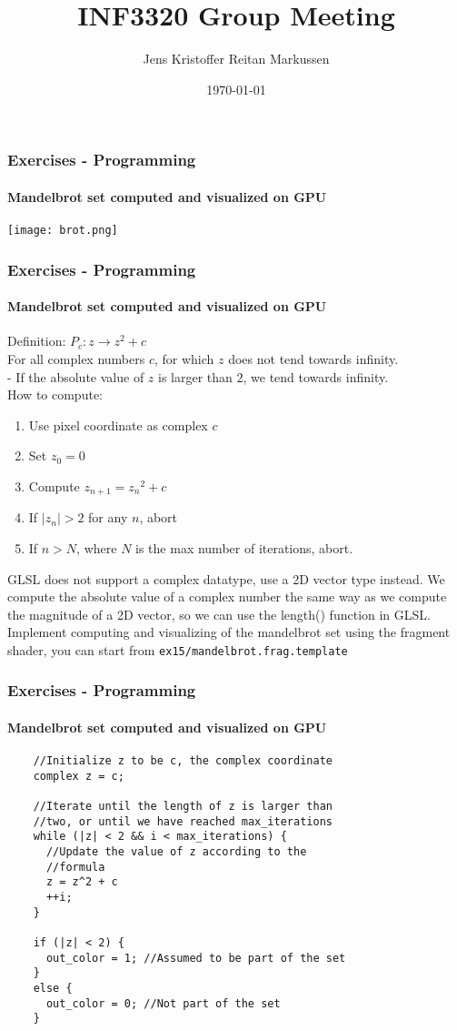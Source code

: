 \documentclass[8pt]{beamer}
\title{INF3320 Group Meeting}
\author{Jens Kristoffer Reitan Markussen}
\date{\today}
\begin{document}

	\begin{frame}
	\frametitle{Exercises - Programming}
	\framesubtitle{Mandelbrot set computed and visualized on GPU}
	\texttt{[image: brot.png]}
	
	\end{frame}
	
	\begin{frame}[fragile]
	\frametitle{Exercises - Programming}
	\framesubtitle{Mandelbrot set computed and visualized on GPU}
	Definition: $P_c:z\rightarrow z^2 + c$\\ 
	For all complex numbers $c$, for which $z$ does not tend towards infinity. \\
	- If the absolute value of $z$ is larger than $2$, we tend towards infinity.  
	\\ \bigskip
	How to compute:
	\begin{enumerate}
	\item Use pixel coordinate as complex $c$
	\item Set $z_0 = 0$
	\item Compute $z_{n+1} = {z_n}^2 + c$
	\item If $|z_n| > 2$ for any $n$, abort
	\item If $n > N$, where $N$ is the max number of iterations, abort.
	\end{enumerate}
	
	\bigskip
	GLSL does not support a complex datatype, use a 2D vector type instead. We compute the absolute value of a complex number the same way as we compute the magnitude of a 2D vector, so we can use the length() function in GLSL. \\ \bigskip
	Implement computing and visualizing of the mandelbrot set using the fragment shader, you can start from \verb|ex15/mandelbrot.frag.template|
	
	\end{frame}	
	
	\begin{frame}[fragile]
	\frametitle{Exercises - Programming}
	\framesubtitle{Mandelbrot set computed and visualized on GPU}
	\begin{lstlisting}
	//Initialize z to be c, the complex coordinate
	complex z = c;
	
	//Iterate until the length of z is larger than
	//two, or until we have reached max_iterations
	while (|z| < 2 && i < max_iterations) {
	  //Update the value of z according to the
	  //formula
	  z = z^2 + c
	  ++i;
	}
	
	if (|z| < 2) {
	  out_color = 1; //Assumed to be part of the set
	}
	else {
	  out_color = 0; //Not part of the set
	}
	\end{lstlisting}
	
	\end{frame}
	
\end{document}
